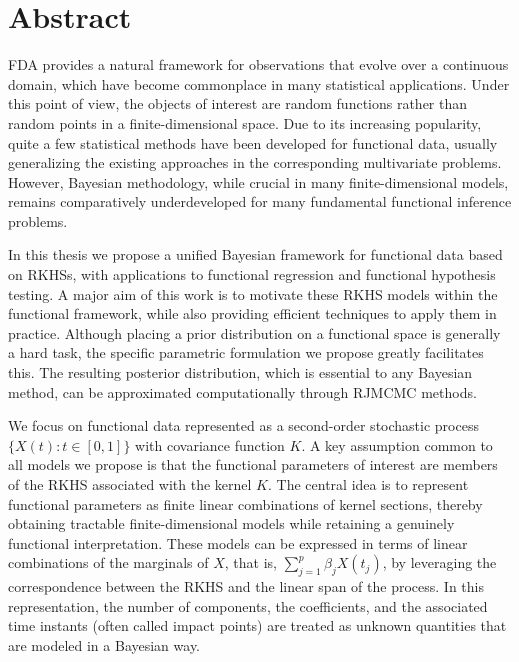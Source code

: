 
\begingroup
\let\clearpage\relax
\let\cleardoublepage\relax
\let\cleardoublepage\relax

\chapter*{Abstract}


\acf{FDA} provides a natural framework for observations that evolve over a continuous domain, which have become commonplace in many statistical applications. Under this point of view, the objects of interest are random functions rather than random points in a finite-dimensional space. Due to its increasing popularity, quite a few statistical methods have been developed for functional data, usually generalizing the existing approaches in the corresponding multivariate problems. However, Bayesian methodology, while crucial in many finite-dimensional models, remains comparatively underdeveloped for many fundamental functional inference problems. 

In this thesis we propose a unified Bayesian framework for functional data based on \acf{RKHSs}, with applications to functional regression and functional hypothesis testing. A major aim of this work is to motivate these \acs{RKHS} models within the functional framework, while also providing efficient techniques to apply them in practice. Although placing a prior distribution on a functional space is generally a hard task, the specific parametric formulation we propose greatly facilitates this. The resulting posterior distribution, which is essential to any Bayesian method, can be approximated computationally through \acf{RJMCMC} methods.

We focus on functional data represented as a second-order stochastic process \(\{X(t): t\in[0,1]\}\) with covariance function \(K\). A key assumption common to all models we propose is that the functional parameters of interest are members of the \acs{RKHS} associated with the kernel \(K\). The central idea is to represent functional parameters as finite linear combinations of kernel sections, thereby obtaining tractable finite-dimensional models while retaining a genuinely functional interpretation. These models can be expressed in terms of linear combinations of the marginals of \(X\), that is, \(\sum_{j=1}^p \beta_j X(t_j)\), by leveraging the correspondence between the \acs{RKHS} and the linear span of the process. In this representation, the number of components, the coefficients, and the associated time instants (often called impact points) are treated as unknown quantities that are modeled in a Bayesian way.

